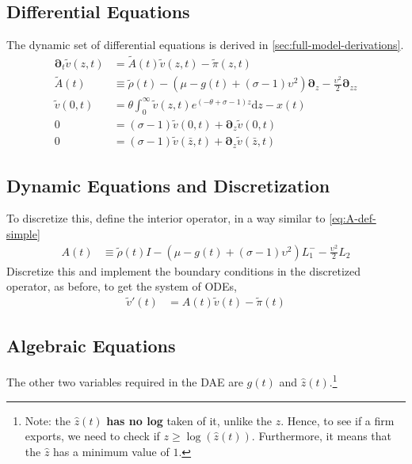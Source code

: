 \documentclass[11pt]{article}
\newcommand{\D}[1][]{\ensuremath{\boldsymbol{\partial}_{#1}}}
\newcommand{\diff}{\ensuremath{\mathrm{d}}}
\begin{document}
\subsection{Differential Equations}
The dynamic set of differential equations is derived in \cref{sec:full-model-derivations}.
\begin{align}
	\D[t]\tilde{v}(z,t) &= \tilde{A}(t)\tilde{v}(z,t) - \tilde{\pi}(z,t) \\	
	\tilde{A}(t) &\equiv \tilde{\rho}(t)  - (\mu - g(t) + (\sigma - 1)\upsilon^2)\D[z] - \frac{\upsilon^2}{2}\D[zz]\\
	\tilde{v}(0,t) &= \theta \int_{0}^{\infty}\tilde{v}(z,t) e^{(-\theta + \sigma - 1)z} \diff z - x(t)\label{eq:normalized-vm-summary-rescaled}\\
	0 &= (\sigma - 1)\tilde{v}(0,t) + \D[z] \tilde{v}(0,t)\label{eq:normalized-sp-summary-rescaled}\\
	0 &= (\sigma - 1)\tilde{v}(\bar{z},t) + \D[z] \tilde{v}(\bar{z},t)\label{eq:normalized-rhs-summary-rescaled}
\end{align}
\subsection{Dynamic Equations and Discretization}
To discretize this, define the interior operator, in a way similar to \cref{eq:A-def-simple}
\begin{align}
	A(t) &\equiv \tilde{\rho}(t) I - (\mu - g(t) + (\sigma - 1)\upsilon^2) L^{-}_1 - \frac{\upsilon^2}{2} L_2\label{eq:A-def-full}
	\end{align}
Discretize this and implement the boundary conditions in the discretized operator, as before, to get the system of ODEs,
\begin{align}
	\tilde{v}'(t) &= A(t) \tilde{v}(t) - \tilde{\pi}(t)
\end{align}	
\subsection{Algebraic Equations}
The other two variables required in the DAE are $g(t)$ and $\hat{z}(t)$.\footnote{Note: the $\hat{z}(t)$ \textbf{has no log} taken of it, unlike the $z$.  Hence, to see if a firm exports, we need to check if $z \geq \log(\hat{z}(t))$.  Furthermore, it means that the $\hat{z}$ has a minimum value of $1$.}
\end{document}
